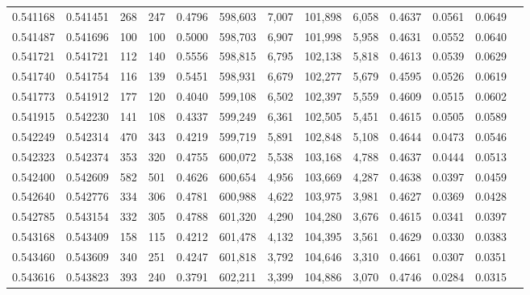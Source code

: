 \begin{tabular}{rrrrrrrrrrrrr}
0.541168 & 0.541451 &   268 &   247 &                                     0.4796 & 598,603 &   7,007 & 101,898 &   6,058 & 0.4637 & 0.0561 & 0.0649 \\
0.541487 & 0.541696 &   100 &   100 &                                     0.5000 & 598,703 &   6,907 & 101,998 &   5,958 & 0.4631 & 0.0552 & 0.0640 \\
0.541721 & 0.541721 &   112 &   140 &                                     0.5556 & 598,815 &   6,795 & 102,138 &   5,818 & 0.4613 & 0.0539 & 0.0629 \\
0.541740 & 0.541754 &   116 &   139 &                                     0.5451 & 598,931 &   6,679 & 102,277 &   5,679 & 0.4595 & 0.0526 & 0.0619 \\
0.541773 & 0.541912 &   177 &   120 &                                     0.4040 & 599,108 &   6,502 & 102,397 &   5,559 & 0.4609 & 0.0515 & 0.0602 \\
0.541915 & 0.542230 &   141 &   108 &                                     0.4337 & 599,249 &   6,361 & 102,505 &   5,451 & 0.4615 & 0.0505 & 0.0589 \\
0.542249 & 0.542314 &   470 &   343 &                                     0.4219 & 599,719 &   5,891 & 102,848 &   5,108 & 0.4644 & 0.0473 & 0.0546 \\
0.542323 & 0.542374 &   353 &   320 &                                     0.4755 & 600,072 &   5,538 & 103,168 &   4,788 & 0.4637 & 0.0444 & 0.0513 \\
0.542400 & 0.542609 &   582 &   501 &                                     0.4626 & 600,654 &   4,956 & 103,669 &   4,287 & 0.4638 & 0.0397 & 0.0459 \\
0.542640 & 0.542776 &   334 &   306 &                                     0.4781 & 600,988 &   4,622 & 103,975 &   3,981 & 0.4627 & 0.0369 & 0.0428 \\
0.542785 & 0.543154 &   332 &   305 &                                     0.4788 & 601,320 &   4,290 & 104,280 &   3,676 & 0.4615 & 0.0341 & 0.0397 \\
0.543168 & 0.543409 &   158 &   115 &                                     0.4212 & 601,478 &   4,132 & 104,395 &   3,561 & 0.4629 & 0.0330 & 0.0383 \\
0.543460 & 0.543609 &   340 &   251 &                                     0.4247 & 601,818 &   3,792 & 104,646 &   3,310 & 0.4661 & 0.0307 & 0.0351 \\
0.543616 & 0.543823 &   393 &   240 &                                     0.3791 & 602,211 &   3,399 & 104,886 &   3,070 & 0.4746 & 0.0284 & 0.0315 \\

\end{tabular}
